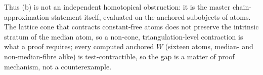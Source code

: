 Thus (b) is not an independent homotopical obstruction: it is the master
chain-approximation statement itself, evaluated on the anchored
subobjects of atoms.  The lattice cone that contracts constant-free atoms
does not preserve the intrinsic stratum of the median atom, so a
non-cone, triangulation-level contraction is what a proof requires; every
computed anchored $W$ (sixteen atoms, median- and non-median-fibre alike)
is test-contractible, so the gap is a matter of proof mechanism, not a
counterexample.
